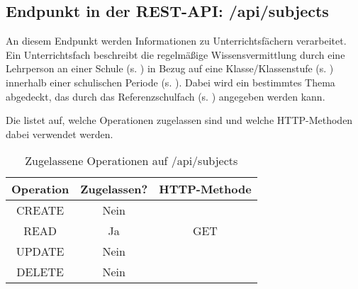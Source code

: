 \subsection{Endpunkt in der REST-API: /api/subjects}
\label{sec:end:rest:api:schools-periods}
An diesem Endpunkt werden Informationen zu Unterrichtsfächern verarbeitet. Ein Unterrichtsfach beschreibt die regelmäßige Wissensvermittlung durch eine Lehrperson an einer Schule (s. ) in Bezug auf eine Klasse/Klassenstufe (s. ) innerhalb einer schulischen Periode (s. ). Dabei wird ein bestimmtes Thema abgedeckt, das durch das Referenzschulfach (s. ) angegeben werden kann.

Die  listet auf, welche Operationen zugelassen sind und welche HTTP-Methoden dabei verwendet werden. 

\begin{table}[!htbp]
	\begin{tabular}{|c|c|c|}
		\hline
			\textbf{Operation} & \textbf{Zugelassen?} & \textbf{HTTP-Methode} \\ \hline
			CREATE & Nein &  \\ \hline 
			READ & Ja & GET \\ \hline
			UPDATE & Nein & \\ \hline 
			DELETE & Nein & \\ \hline
	\end{tabular}

		\caption{Zugelassene Operationen auf /api/subjects}
		\label{tab:end:rest:api:subjects:meth}
\end{table}

